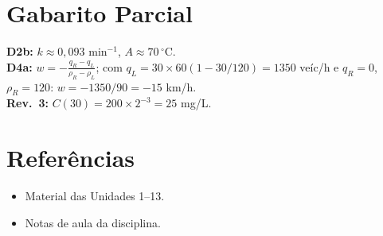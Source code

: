 \documentclass[12pt,a4paper]{article}
\begin{document}
\section*{Gabarito Parcial}
\textbf{D2b:} $k \approx 0{,}093$ min$^{-1}$, $A \approx 70\,^\circ$C.\\
\textbf{D4a:} $w = -\frac{q_R-q_L}{\rho_R-\rho_L}$; com $q_L = 30\times60(1-30/120) = 1350$ ve\'ic/h e $q_R=0$, $\rho_R=120$: $w = -1350/90 = -15$ km/h.\\
\textbf{Rev.\ 3:} $C(30) = 200\times2^{-3} = 25$ mg/L.

\section*{Refer\^encias}
\begin{itemize}
  \item Material das Unidades 1--13.
  \item Notas de aula da disciplina.
\end{itemize}
\end{document}
